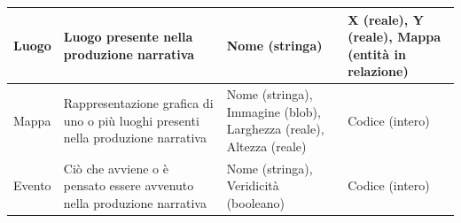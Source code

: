 \documentclass{article}
\begin{document}
\begin{center}
\begin{tabular}{|p{}|p{}|p{}|p{}|}
		\hline
		Luogo                & Luogo presente nella produzione narrativa                                          & Nome (stringa)                                                                                                   & X (reale), Y (reale), Mappa (entità in relazione)           \\
		\hline
		Mappa                & Rappresentazione grafica di uno o più luoghi presenti nella produzione narrativa   & Nome (stringa), Immagine (blob), Larghezza (reale), Altezza (reale)                                              & Codice (intero)                                             \\
		\hline
		Evento               & Ciò che avviene o è pensato essere avvenuto nella produzione narrativa             & Nome (stringa), Veridicità (booleano)                                                                            & Codice (intero)                                             \\
		\hline
	\end{tabular}\end{center}
\end{document}
